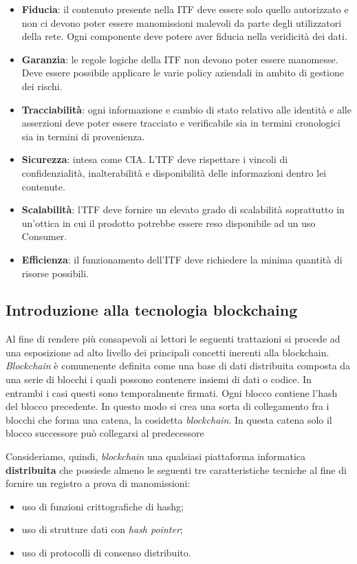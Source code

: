 \begin{itemize}
    \item \textbf{Fiducia}: il contenuto presente nella ITF deve essere solo quello autorizzato e non ci devono poter essere manomissioni malevoli da parte degli utilizzatori della rete. Ogni componente deve potere aver fiducia nella veridicità dei dati.
    \item \textbf{Garanzia}: le regole logiche della ITF non devono poter essere manomesse. Deve essere possibile applicare le varie policy aziendali in ambito di gestione dei rischi.
    \item \textbf{Tracciabilità}: ogni informazione e cambio di stato relativo alle identità e alle asserzioni deve poter essere tracciato e verificabile sia in termini cronologici sia in termini di provenienza. 
    \item \textbf{Sicurezza}: intesa come CIA. L’ITF deve rispettare i vincoli di confidenzialità, inalterabilità e disponibilità delle informazioni dentro lei contenute.
    \item \textbf{Scalabilità}: l’ITF deve fornire un elevato grado di scalabilità soprattutto in un’ottica in cui il prodotto potrebbe essere reso disponibile ad un uso Consumer.
    \item \textbf{Efficienza}: il funzionamento dell’ITF deve richiedere la minima quantità di risorse possibili.
\end{itemize}

\subsection{Introduzione alla tecnologia \gls{blockchaing}}
Al fine di rendere più consapevoli ai lettori le seguenti trattazioni si procede ad una esposizione ad alto livello dei principali concetti inerenti alla blockchain.
\emph{Blockchain} è comunenente definita come una base di dati distribuita composta da una serie di blocchi i quali possono contenere insiemi di dati o codice. In entrambi i casi questi sono temporalmente firmati.
Ogni blocco contiene l'hash del blocco precedente. In questo modo si crea una sorta di collegamento fra i blocchi che forma una catena, la cosidetta \emph{blockchain}. In questa catena solo il blocco successore può collegarsi al predecessore

Consideriamo, quindi, \emph{blockchain} una qualsiasi piattaforma informatica \textbf{distribuita} che possiede almeno le seguenti tre caratteristiche tecniche al fine di fornire un registro a prova di manomissioni: 
\begin{itemize}
    \item uso di funzioni crittografiche di \gls{hashg};
    \item uso di strutture dati con \emph{hash pointer};
    \item uso di protocolli di consenso distribuito.
\end{itemize}

